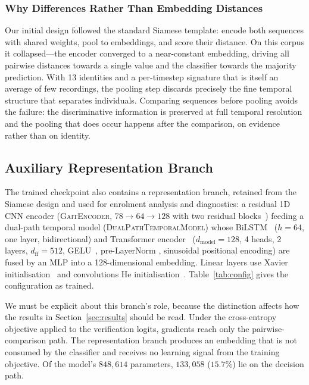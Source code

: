 \documentclass[journal]{IEEEtran}
\begin{document}
\subsubsection{Why Differences Rather Than Embedding Distances}
Our initial design followed the standard Siamese template: encode both
sequences with shared weights, pool to embeddings, and score their distance. On
this corpus it collapsed---the encoder converged to a near-constant embedding,
driving all pairwise distances towards a single value and the classifier
towards the majority prediction. With 13 identities and a per-timestep
signature that is itself an average of few recordings, the pooling step
discards precisely the fine temporal structure that separates individuals.
Comparing sequences before pooling avoids the failure: the discriminative
information is preserved at full temporal resolution and the pooling that does
occur happens after the comparison, on evidence rather than on identity.

\subsection{Auxiliary Representation Branch}
\label{sec:aux}

The trained checkpoint also contains a representation branch, retained from the
Siamese design and used for enrolment analysis and diagnostics: a residual 1D
CNN encoder (\textsc{GaitEncoder}, $78 \rightarrow 64 \rightarrow 128$ with two
residual blocks~\cite{resnet}) feeding a dual-path temporal model
(\textsc{DualPathTemporalModel}) whose BiLSTM~\cite{lstm} ($h=64$, one layer,
bidirectional) and Transformer encoder~\cite{vaswani} ($d_{\text{model}}=128$,
4 heads, 2 layers, $d_{\text{ff}}=512$, GELU~\cite{gelu}, pre-LayerNorm
\cite{preln}, sinusoidal positional encoding) are fused by an MLP into a
128-dimensional embedding. Linear layers use Xavier
initialisation~\cite{glorot_init} and convolutions He
initialisation~\cite{he_init}. Table~\ref{tab:config} gives the configuration
as trained.

We must be explicit about this branch's role, because the distinction affects
how the results in Section~\ref{sec:results} should be read. Under the
cross-entropy objective applied to the verification logits, gradients reach
only the pairwise-comparison path. The representation branch produces an
embedding that is not consumed by the classifier and receives no learning
signal from the training objective. Of the model's $848{,}614$ parameters,
$133{,}058$ ($15.7\%$) lie on the decision path.
\end{document}
